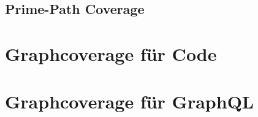 \subsection{Prime-Path Coverage}







\section{Graphcoverage für Code}

\section{Graphcoverage für GraphQL}




